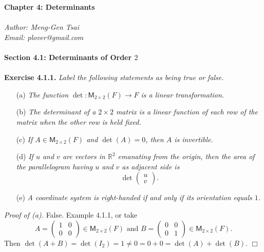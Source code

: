 \documentclass{article}
\begin{document}
\textbf{\Large Chapter 4: Determinants} \\\\



\emph{Author: Meng-Gen Tsai} \\
\emph{Email: plover@gmail.com} \\\\






\textbf{\large Section 4.1: Determinants of Order $2$} \\\\



\textbf{Exercise 4.1.1.}
\emph{Label the following statements as being true or false.}
\begin{enumerate}
\item[(a)]
\emph{The function $\det: \mathsf{M}_{2 \times 2}(F) \to F$
is a linear transformation.}
\item[(b)]
\emph{The determinant of a $2 \times 2$ matrix is a linear function of each row
of the matrix when the other row is held fixed.}
\item[(c)]
\emph{If $A \in \mathsf{M}_{2 \times 2}(F)$ and $\det(A) = 0$, then $A$ is invertible.}
\item[(d)]
\emph{If $u$ and $v$ are vectors in $\mathbb{R}^2$ emanating from the origin,
then the area of the parallelogram having $u$ and $v$ as adjacent side is
$$\det\begin{pmatrix} u \\ v \end{pmatrix}.$$}
\item[(e)]
\emph{A coordinate system is right-handed if and only if its orientation equals $1$.} \\
\end{enumerate}

\emph{Proof of (a).}
False. Example 4.1.1, or
take
$$A =
\begin{pmatrix}
1 & 0 \\
0 & 0
\end{pmatrix} \in \mathsf{M}_{2 \times 2}(F) \text{ and }
B =
\begin{pmatrix}
0 & 0 \\
0 & 1
\end{pmatrix} \in \mathsf{M}_{2 \times 2}(F).
$$
Then $\det(A+B) = \det(I_2) = 1 \neq 0 = 0 + 0 = \det(A) + \det(B)$.
$\Box$ \\
\end{document}
